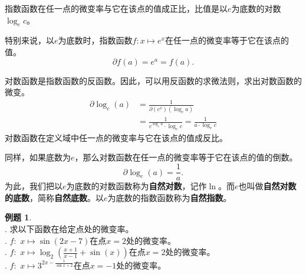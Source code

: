 \documentclass[12pt,UTF8]{ctexbook}
\theoremstyle{definition}
\newtheorem{et}{例题}[section]
\theoremstyle{plain}
\begin{document}
指数函数在任一点的微变率与它在该点的值成正比，比值是以$e$为底数的对数$\log_e{c}$。

特别来说，以$e$为底数时，指数函数$f: x\mapsto e^x$在任一点的微变率等于它在该点的值。
$$ \partial f (a) = e^a = f(a).$$

对数函数是指数函数的反函数。因此，可以用反函数的求微法则，求出对数函数的微变。
\begin{align*}
    \partial \log_c (a) &= \frac{1}{\partial (c^x) (\log_c{a})}  \\
    &= \frac{1}{c^{\log_c{a}} \cdot \log_e{c}} = \frac{1}{a \cdot \log_e{c}}   
\end{align*}
对数函数在定义域中任一点的微变率与它在该点的值成反比。

同样，如果底数为$e$，那么对数函数在任一点的微变率等于它在该点的值的倒数。
$$ \partial \log_e (a) = \frac{1}{a}.$$
为此，我们把以$e$为底数的对数函数称为\textbf{自然对数}，记作$\ln$。而$e$也叫做\textbf{自然对数的底数}，简称\textbf{自然底数}。以$e$为底数的指数函数称为\textbf{自然指数}。

\begin{et}
    \mbox{} \\
    . 求以下函数在给定点处的微变率。\\
    . $f: \,\, x \mapsto \sin{(2x - 7)}$在点$x = 2$处的微变率。\\
    . $f: \,\, x \mapsto \log_2{\left(\frac{x+1}{x-1} + \sin(x)\right)}$在点$x = 2$处的微变率。\\
    . $f: \,\, x \mapsto 3^{2x - \frac{1}{\sin{x} + 2}}$在点$x = -1$处的微变率。\\
\end{et}
\end{document}
